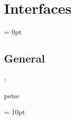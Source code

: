 
\section{Interfaces} 


\parskip = 0pt

\vspace{3mm} \subsection*{General}

: 

petsc
\vspace{2mm}

\vspace{5mm}\parskip = 10pt 
